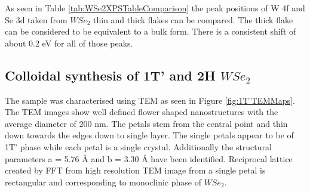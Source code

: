 As seen in Table \ref{tab:WSe2XPSTableComparison} the peak positions of W 4f and Se 3d taken from $WSe_2$ thin and thick flakes can be compared. The thick flake can be considered to be equivalent to a bulk form. There is a consistent shift of about 0.2 eV for all of those peaks.

\subsection{Colloidal synthesis of 1T' and 2H $WSe_2$}

The sample was characterised using TEM as seen in Figure \ref{fig:1T'TEMMaps}. The TEM images show well defined flower shaped nanostructures with the average diameter of 200 nm. The petals stem from the central point and thin down towards the edges down to single layer. The single petals appear to be of 1T' phase while each petal is a single crystal. Additionally the structural parameters a = 5.76 \r{A} and b = 3.30 \r{A} have been identified. Reciprocal lattice created by FFT from high resolution TEM image from a single petal is rectangular and corresponding to monoclinic phase of $WSe_2$.


